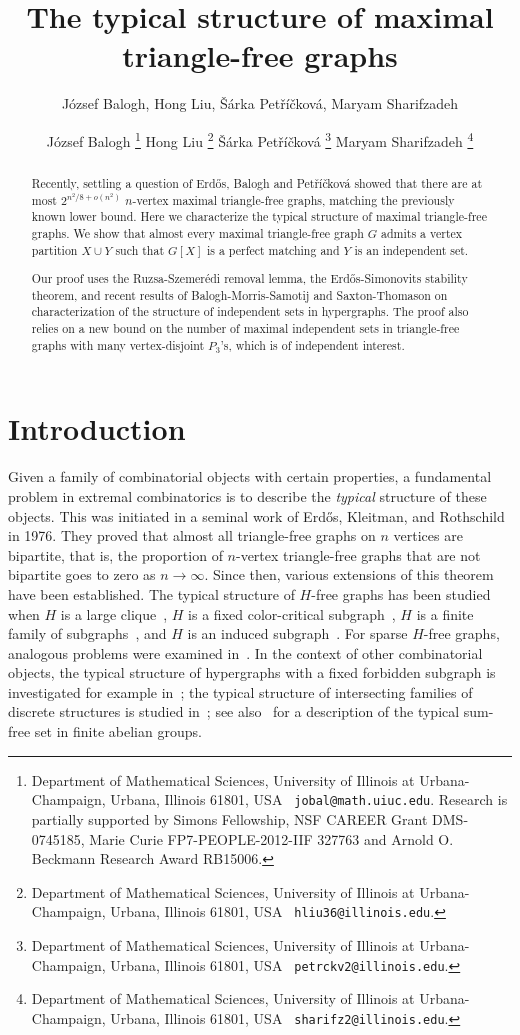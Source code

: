 \documentclass[12pt]{article}
\title{The typical structure of maximal triangle-free graphs}
\author{J\'{o}zsef Balogh, Hong Liu, \v{S}\'{a}rka Pet\v{r}\'{i}\v{c}kov\'{a}, Maryam Sharifzadeh}
\author{
 J\'ozsef Balogh
 \thanks{Department of Mathematical Sciences,
 University of Illinois at Urbana-Champaign, Urbana, Illinois 61801, USA {\tt
jobal@math.uiuc.edu}. Research is partially supported by Simons Fellowship, NSF
CAREER Grant
 DMS-0745185, Marie Curie FP7-PEOPLE-2012-IIF 327763 and Arnold O. Beckmann Research Award RB15006.}
 \quad
 Hong Liu
 \thanks{Department of Mathematical Sciences,
 University of Illinois at Urbana-Champaign, Urbana, Illinois 61801, USA {\tt
hliu36@illinois.edu}.}
\quad
\v{S}\'{a}rka Pet\v{r}\'{i}\v{c}kov\'{a}
 \thanks{Department of Mathematical Sciences,
 University of Illinois at Urbana-Champaign, Urbana, Illinois 61801, USA {\tt
petrckv2@illinois.edu}.}
 \quad
 Maryam Sharifzadeh
 \thanks{Department of Mathematical Sciences,
 University of Illinois at Urbana-Champaign, Urbana, Illinois 61801, USA {\tt
sharifz2@illinois.edu}.}
}
\theoremstyle{definition}
\theoremstyle{definition}
\theoremstyle{definition}
\theoremstyle{definition}
\theoremstyle{definition}
\theoremstyle{definition}
\theoremstyle{definition}
\newcommand{\3}{\bf{3}}
\begin{document}
\maketitle

\begin{abstract}
Recently, settling a question of Erd\H{o}s, Balogh and Pet\v{r}\'{i}\v{c}kov\'{a} showed that there are at most $2^{n^2/8+o(n^2)}$ $n$-vertex maximal triangle-free graphs, matching the previously known lower bound. Here we characterize the typical structure of maximal triangle-free graphs. We show that almost every maximal triangle-free graph $G$ admits a vertex partition $X\cup Y$ such that $G[X]$ is a perfect matching and $Y$ is an independent set.  

Our proof uses the Ruzsa-Szemer\'{e}di removal lemma, the Erd\H{o}s-Simonovits stability theorem, and recent results of Balogh-Morris-Samotij and Saxton-Thomason on characterization of the structure of independent sets in hypergraphs. The proof also relies on a new bound on the number of maximal independent sets in triangle-free graphs with many vertex-disjoint $P_3$'s, which is of independent interest.  
\end{abstract}



\section{Introduction}
Given a family of combinatorial objects with certain properties, a fundamental problem in extremal combinatorics is to describe the \emph{typical} structure of these objects. This was initiated in a seminal work of Erd\H{o}s, Kleitman, and Rothschild~\cite{Erdos} in 1976. They proved that almost all triangle-free graphs on $n$ vertices are bipartite, that is, the proportion of $n$-vertex triangle-free graphs that are not bipartite goes to zero as $n \to \infty$. Since then, various extensions of this theorem have been established.
The typical structure of $H$-free graphs has been studied when $H$ is a large clique~\cite{B6,KPR},  $H$ is a fixed color-critical subgraph~\cite{PS}, $H$ is a finite family of subgraphs~\cite{BBS2}, and $H$ is an induced subgraph~\cite{BB}. For sparse $H$-free graphs, analogous problems  were examined in~\cite{Balogh2, OPT}. 
In the context of other combinatorial objects, the typical structure of hypergraphs with a fixed forbidden subgraph is investigated for example in~\cite{BMu1,PSch}; the typical structure of intersecting families of discrete structures is studied in~\cite{BDDLS}; see also~\cite{abms14} for a description of the typical sum-free set in finite abelian groups.
\end{document}
